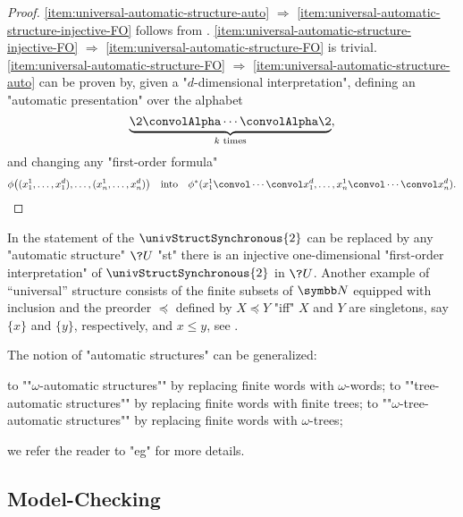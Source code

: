 \begin{proof}
	\eqref{item:universal-automatic-structure-auto} $\Rightarrow$
	\eqref{item:universal-automatic-structure-injective-FO} follows from
	.
	\eqref{item:universal-automatic-structure-injective-FO} $\Rightarrow$
	\eqref{item:universal-automatic-structure-FO} is trivial.
	\eqref{item:universal-automatic-structure-FO} $\Rightarrow$
	\eqref{item:universal-automatic-structure-auto} can be proven by,
	given a "$d$-dimensional interpretation", defining an "automatic presentation"
	over the alphabet
	\[
		\underbrace{\2 \convolAlpha \cdots \convolAlpha \2}_{
			\text{$k$ times}
		},
	\]
	and changing any "first-order formula"
	\[
		\phi\big((x_1^1, \hdots, x_1^d), \hdots, (x_n^1, \hdots, x_n^d)\big)
		\quad\text{into}\quad
		\phi^*(x_1^1 \convol \cdots \convol x_1^d, \hdots, x_n^1 \convol \cdots \convol x_n^d).\qedhere
	\]
\end{proof}

In the statement of \label{prop:universal-automatic-structure} the
$\univStructSynchronous{2}$ can be replaced by any "automatic structure" $\?U$
"st" there is an injective one-dimensional "first-order interpretation" of
$\univStructSynchronous{2}$ in $\?U$. 
Another example of ``universal'' structure consists of the finite subsets of $\N$ equipped
with inclusion and the preorder $\preceq$ defined by $X \preceq Y$ "iff" $X$ and $Y$ are 
singletons, say $\{x\}$ and $\{y\}$, respectively, and $x \leq y$,
see \cite[Theorem~XII.2.3]{Blumensath2024MSOModelTheory}.

The notion of "automatic structures" can be generalized:
\begin{itemize}
	\itemAP to ""$\omega$-automatic structures"" by replacing finite words with $\omega$-words;
	\itemAP to ""tree-automatic structures"" by replacing finite words with finite trees;
	\itemAP to ""$\omega$-tree-automatic structures"" by replacing finite words with $\omega$-trees;
\end{itemize}
we refer the reader to "eg" \cite[\S~XII]{Blumensath2024MSOModelTheory} for more details.

\subsection{Model-Checking}

